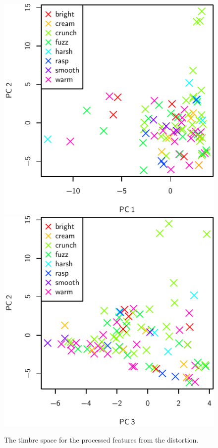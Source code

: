 			\begin{figure}[h!]
				\centering
				\subfloat
				{
					\includegraphics{chapter4/Images/DistortionProcessedPCA1-2.pdf}
					\label{fig:DistortionProcessedPCA1-2}
				}
				\quad
				\subfloat
				{
					\includegraphics{chapter4/Images/DistortionProcessedPCA3-2.pdf}
					\label{fig:DistortionProcessedPCA3-2}
				}
				\caption{The timbre space for the processed features from the distortion.}
				\label{fig:DistortionProcessedPCAs}
			\end{figure}

